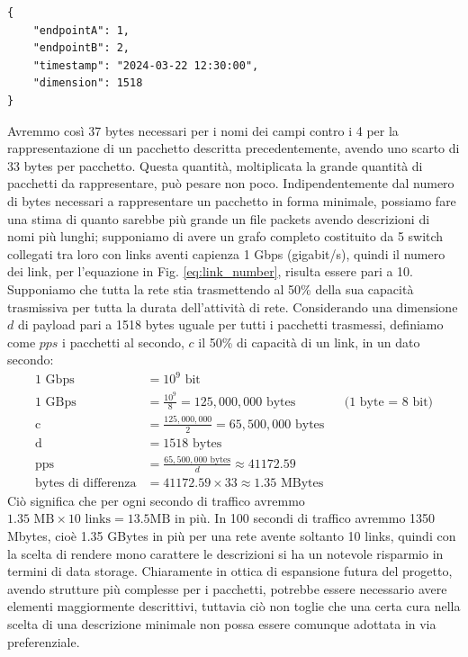 \documentclass[binding=0.6cm]{sapthesis}
\begin{document}
{\scriptsize %
\begin{lstlisting}[caption={Rappresentazione di un pacchetto con descrizione completa}, label={codice:long_description_packet}]
{
    "endpointA": 1,
    "endpointB": 2,
    "timestamp": "2024-03-22 12:30:00",
    "dimension": 1518
}
\end{lstlisting}
}

Avremmo così 37 bytes necessari per i nomi dei campi contro i 4 per la rappresentazione di un pacchetto descritta precedentemente, avendo uno scarto di
33 bytes per pacchetto. Questa quantità, moltiplicata la grande quantità di pacchetti da rappresentare, può pesare non poco.
Indipendentemente dal numero di bytes necessari a rappresentare un pacchetto in forma minimale, possiamo fare una stima di quanto sarebbe più grande
un file packets avendo descrizioni di nomi più lunghi; supponiamo di avere un grafo completo costituito da 5 switch collegati tra loro con links
aventi capienza 1 Gbps (gigabit/s), quindi il numero dei link, per l'equazione in Fig. \ref{eq:link_number}, risulta essere pari a 10. Supponiamo che tutta la rete
stia trasmettendo al 50\% della sua capacità trasmissiva per tutta la durata dell'attività di rete. Considerando una dimensione \(d\) di payload pari 
a 1518 bytes uguale per tutti i pacchetti trasmessi,
definiamo come \(pps\) i pacchetti al secondo, \(c\) il 50\% di capacità di un link, in un dato secondo:
\begin{align*}
    \text{1 Gbps} &= 10^9 \text{ bit}\\
    \text{1 GBps} &= \frac{10^9}{8} = 125,000,000 \text{ bytes} && \text{(1 byte = 8 bit)} \\
    \text{c} &= \frac{125,000,000}{2} = 65,500,000 \text{ bytes}\\
    \text{d} &= 1518 \text{ bytes} \\
    \text{pps} &= \frac{65,500,000 \text{ bytes}}{d}\approx 41172.59\\
    \text{bytes di differenza} &= 41172.59 \times 33 \approx 1.35 \text{ MBytes}
\end{align*}
Ciò significa che per ogni secondo di traffico avremmo \(1.35 \text{ MB} \times 10\text{ links} = 13.5 \text{MB}\) in più. 
 In 100 secondi di traffico avremmo 1350 Mbytes, cioè 1.35 GBytes in più per una rete avente soltanto 10 links, quindi con la scelta di rendere
  mono carattere le descrizioni
 si ha un notevole risparmio in termini di data storage. Chiaramente in ottica di espansione futura del progetto, avendo strutture più complesse
 per i pacchetti, potrebbe essere necessario avere elementi maggiormente descrittivi, tuttavia ciò non toglie che una certa cura nella scelta di una 
 descrizione minimale non possa essere comunque adottata in via preferenziale.
\end{document}
